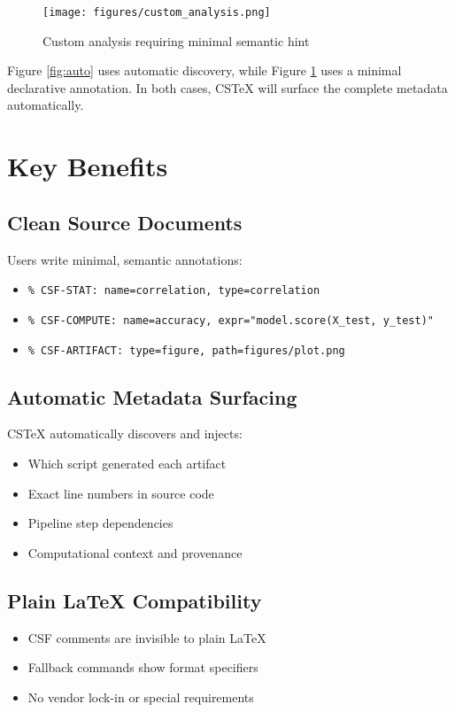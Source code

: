 \documentclass{article}
\begin{document}
\begin{figure}[h]
\centering
\texttt{[image: figures/custom\_analysis.png]}
\caption{Custom analysis requiring minimal semantic hint}
\label{fig:custom}
\end{figure}

Figure \ref{fig:auto} uses automatic discovery, while Figure \ref{fig:custom} uses 
a minimal declarative annotation. In both cases, CSTeX will surface the complete
metadata automatically.

\section{Key Benefits}

\subsection{Clean Source Documents}
Users write minimal, semantic annotations:
\begin{itemize}
    \item \texttt{\% CSF-STAT: name=correlation, type=correlation}
    \item \texttt{\% CSF-COMPUTE: name=accuracy, expr="model.score(X\_test, y\_test)"}
    \item \texttt{\% CSF-ARTIFACT: type=figure, path=figures/plot.png}
\end{itemize}

\subsection{Automatic Metadata Surfacing}
CSTeX automatically discovers and injects:
\begin{itemize}
    \item Which script generated each artifact
    \item Exact line numbers in source code
    \item Pipeline step dependencies
    \item Computational context and provenance
\end{itemize}

\subsection{Plain LaTeX Compatibility}
\begin{itemize}
    \item CSF comments are invisible to plain LaTeX
    \item Fallback commands show format specifiers
    \item No vendor lock-in or special requirements
\end{itemize}
\end{document}

